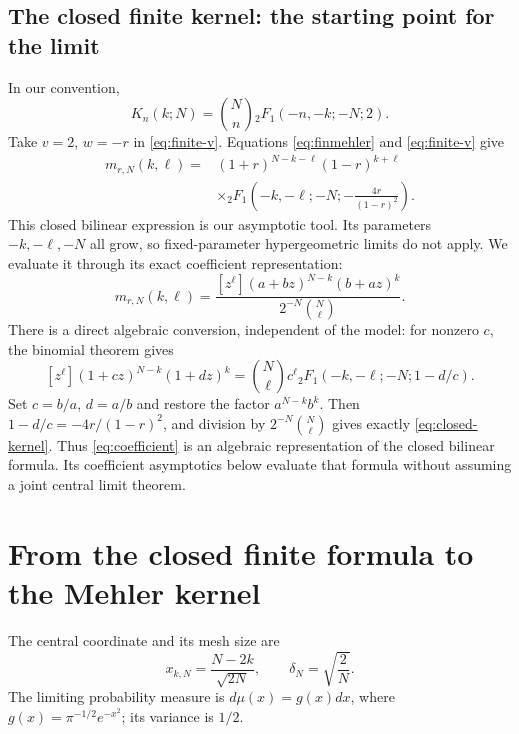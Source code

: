\documentclass[11pt,reqno]{amsart}
\theoremstyle{definition}
\theoremstyle{remark}
\begin{document}
\subsection{The closed finite kernel: the starting point for the limit}
In our convention,
\[
K_n(k;N)=\binom Nn{}_2F_1(-n,-k;-N;2).
\]
Take $v=2$, $w=-r$ in \eqref{eq:finite-v}. Equations
\eqref{eq:finmehler} and \eqref{eq:finite-v} give
\begin{equation}\label{eq:closed-kernel}
\boxed{\begin{aligned}
m_{r,N}(k,\ell)
={}&(1+r)^{N-k-\ell}(1-r)^{k+\ell}\\
&\times{}_2F_1\left(-k,-\ell;-N;
-\frac{4r}{(1-r)^2}\right).
\end{aligned}}
\end{equation}
This closed bilinear expression is our asymptotic tool. Its parameters
$-k,-\ell,-N$ all grow, so fixed-parameter hypergeometric limits do not
apply. We evaluate it through its exact coefficient representation:
\begin{equation}\label{eq:coefficient}
m_{r,N}(k,\ell)
=\frac{[z^\ell](a+bz)^{N-k}(b+az)^k}
{2^{-N}\binom N\ell}.
\end{equation}
There is a direct algebraic conversion, independent of the model:
for nonzero $c$, the binomial theorem gives
\[
[z^\ell](1+cz)^{N-k}(1+dz)^k
=\binom N\ell c^\ell
{}_2F_1(-k,-\ell;-N;1-d/c).
\]
Set $c=b/a$, $d=a/b$ and restore the factor $a^{N-k}b^k$.
Then $1-d/c=-4r/(1-r)^2$, and division by
$2^{-N}\binom N\ell$ gives exactly \eqref{eq:closed-kernel}.
Thus \eqref{eq:coefficient} is an algebraic representation of the
closed bilinear formula. Its coefficient asymptotics below evaluate
that formula without assuming a joint central limit theorem.

\section{From the closed finite formula to the Mehler kernel}\label{L:jointlimit}
The central coordinate and its mesh size are
\begin{equation}\label{eq:coordinates}
x_{k,N}=\frac{N-2k}{\sqrt{2N}},\qquad
\delta_N=\sqrt{\frac2N}.
\end{equation}
The limiting probability measure is
$d\mu(x)=g(x)dx$, where $g(x)=\pi^{-1/2}e^{-x^2}$; its variance is $1/2$.
\end{document}
